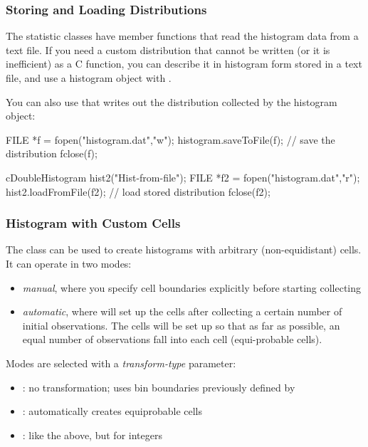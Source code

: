 \subsubsection{Storing and Loading Distributions}


The statistic classes have  member functions
that read the histogram data from a text file. If you need a custom
distribution that cannot be written (or it
is inefficient) as a C function, you can describe it in histogram form
stored in a text file, and use a histogram object with
.

You can also use that writes out the distribution
collected by the histogram object:

\begin{cpp}
FILE *f = fopen("histogram.dat","w");
histogram.saveToFile(f); // save the distribution
fclose(f);

cDoubleHistogram hist2("Hist-from-file");
FILE *f2 = fopen("histogram.dat","r");
hist2.loadFromFile(f2); // load stored distribution
fclose(f2);
\end{cpp}


\subsubsection{Histogram with Custom Cells}


The  class can be used to create
histograms with arbitrary (non-equidistant) cells.
It can operate in two modes:

\begin{itemize}
  \item \textit{manual}, where you specify cell boundaries explicitly
     before starting collecting
  \item \textit{automatic}, where  will set up the cells
     after collecting a certain number of initial observations. The cells
     will be set up so that as far as possible, an equal number of observations
     fall into each cell (equi-probable cells).
\end{itemize}

Modes are selected with a \textit{transform-type} parameter:
\begin{itemize}
  \item{: no transformation; uses bin boundaries
    previously defined by }
  \item{: automatically creates equiprobable cells}
  \item{: like the above, but for integers}
\end{itemize}


